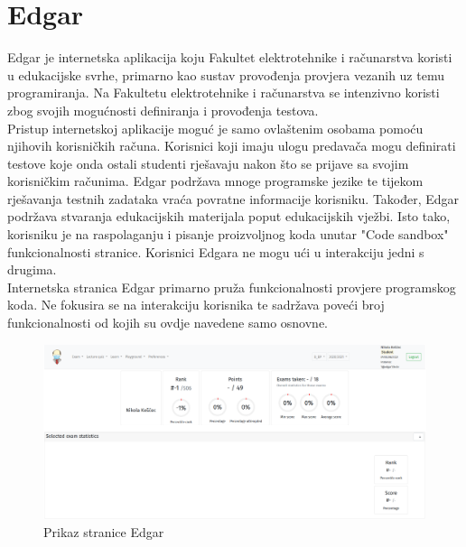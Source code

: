 \documentclass[times, utf8, zavrsni, numeric]{fer}
\begin{document}
		\section{Edgar}
		Edgar je internetska aplikacija koju Fakultet elektrotehnike i računarstva koristi u edukacijske svrhe, primarno kao sustav provođenja provjera vezanih uz temu programiranja. Na Fakultetu elektrotehnike i računarstva se intenzivno koristi zbog svojih mogućnosti definiranja i provođenja testova. \\
		Pristup internetskoj aplikacije moguć je samo ovlaštenim osobama pomoću njihovih korisničkih računa. Korisnici koji imaju ulogu predavača mogu definirati testove koje onda ostali studenti rješavaju nakon što se prijave sa svojim korisničkim računima. Edgar podržava mnoge programske jezike te tijekom rješavanja testnih zadataka vraća povratne informacije korisniku. Također, Edgar podržava stvaranja edukacijskih materijala poput edukacijskih vježbi. Isto tako, korisniku je na raspolaganju i pisanje proizvoljnog koda unutar "Code sandbox" funkcionalnosti stranice. Korisnici Edgara ne mogu ući u interakciju jedni s drugima.\\
		Internetska stranica Edgar primarno pruža funkcionalnosti provjere programskog koda. Ne fokusira se na interakciju korisnika te sadržava poveći broj funkcionalnosti od kojih su ovdje navedene samo osnovne.
		\begin{figure}[H]
			\centering
			\includegraphics[width=\linewidth]{pictures/prikazi/Edgar.png}
			\caption{Prikaz stranice Edgar}
			\label{fig:edgar}
		\end{figure}
	
\end{document}
